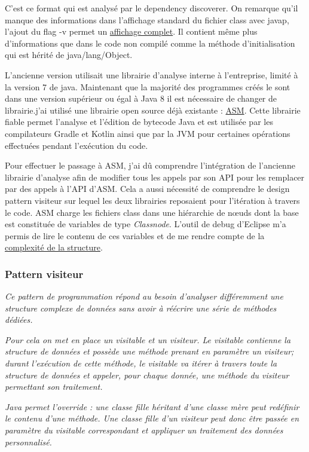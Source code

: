 \documentclass[french,a4paper,12pt]{report}
\begin{document}
C'est ce format qui est analysé par le dependency discoverer. On remarque qu'il manque des informations dans l'affichage standard du fichier class avec javap, l'ajout du flag -v permet un \hyperref[javapVtestASM]{affichage complet}. Il contient même plus d'informations que dans le code non compilé comme la méthode d'initialisation qui est hérité de java/lang/Object.

\bigskip

L'ancienne version utilisait une librairie d'analyse interne à l'entreprise, limité à la version 7 de java. Maintenant que la majorité des programmes créés le sont dans une version supérieur ou égal à Java 8 il est nécessaire  de changer de librairie.j'ai utilisé une librairie open source déjà existante : \href{https://asm.ow2.io/}{ASM}. Cette librairie fiable permet l'analyse et l'édition de bytecode Java et est utilisée par les compilateurs Gradle et Kotlin ainsi que par la JVM pour certaines opérations effectuées pendant l’exécution du code.

Pour effectuer le passage à ASM, j'ai dû comprendre l'intégration de l'ancienne librairie d'analyse afin de modifier tous les appels par son API pour les remplacer par des appels à l'API d'ASM. Cela a aussi nécessité de comprendre le design pattern visiteur sur lequel les deux librairies reposaient pour l'itération à travers le code. ASM charge les fichiers class dans une hiérarchie de nœuds dont la base est constituée de variables de type \textit{Classnode}. L'outil de debug d'Eclipse m'a permis de lire le contenu de ces variables et de me rendre compte de la \hyperref[ClassNode]{complexité de la structure}.

\bigskip

\subsubsection{Pattern visiteur} 

\textit{Ce pattern de programmation répond au besoin d'analyser différemment une structure complexe de données sans avoir à réécrire une série de méthodes dédiées.}

\textit{Pour cela on met en place un visitable et un visiteur. Le visitable contienne la structure de données et possède une méthode prenant en paramètre un visiteur; durant l’exécution de cette méthode, le visitable va itérer à travers toute la structure de données et appeler, pour chaque donnée, une méthode du visiteur permettant son traitement.}

\textit{Java permet l'override : une classe fille héritant d'une classe mère peut redéfinir le contenu d'une méthode. Une classe fille d'un visiteur peut donc être passée en paramètre du visitable correspondant et appliquer un traitement des données personnalisé.}
\end{document}
